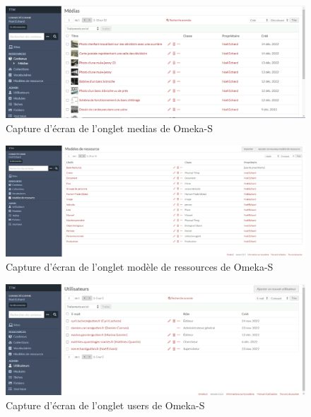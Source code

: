 \begin{figure} [H]
    \centering
    \includegraphics[width=1\textwidth]{assets/omeka/onglet_media_omeka.png}
    \caption{Capture d'écran de l'onglet medias de Omeka-S}
    \label{fig:pageMediasOmeka}
\end{figure}

\begin{figure} [H]
    \centering
    \includegraphics[width=1\textwidth]{assets/omeka/onglet_modele_ressource_omeka.png}
    \caption{Capture d'écran de l'onglet modèle de ressources de Omeka-S}
    \label{fig:pageModRessourceOmeka}
\end{figure}

\begin{figure} [H]
    \centering
    \includegraphics[width=1\textwidth]{assets/omeka/onglet_users_omeka.png}
    \caption{Capture d'écran de l'onglet users de Omeka-S}
    \label{fig:pageUsersOmeka}
\end{figure}

